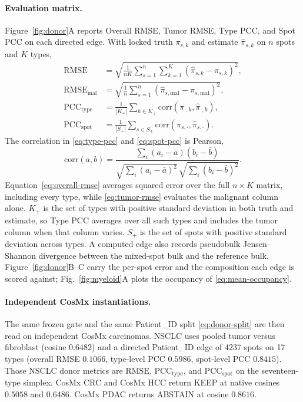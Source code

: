 \paragraph{Evaluation matrix.}
Figure~\ref{fig:donor}A reports Overall RMSE, Tumor RMSE, Type PCC, and Spot PCC on each directed edge. With locked truth \(\pi_{s,k}\) and estimate \(\hat\pi_{s,k}\) on \(n\) spots and \(K\) types,
\begin{align}
\mathrm{RMSE}
&= \sqrt{\frac{1}{nK}\sum_{s=1}^{n}\sum_{k=1}^{K}(\hat\pi_{s,k}-\pi_{s,k})^{2}},
\label{eq:overall-rmse}\\
\mathrm{RMSE}_{\mathrm{mal}}
&= \sqrt{\frac{1}{n}\sum_{s=1}^{n}(\hat\pi_{s,\mathrm{mal}}-\pi_{s,\mathrm{mal}})^{2}},
\label{eq:tumor-rmse}\\
\mathrm{PCC}_{\mathrm{type}}
&= \frac{1}{|K_+|}\sum_{k\in K_+}\mathrm{corr}(\pi_{\cdot,k},\hat\pi_{\cdot,k}),
\label{eq:type-pcc}\\
\mathrm{PCC}_{\mathrm{spot}}
&= \frac{1}{|S_+|}\sum_{s\in S_+}\mathrm{corr}(\pi_{s,\cdot},\hat\pi_{s,\cdot}).
\label{eq:spot-pcc}
\end{align}
The correlation in \eqref{eq:type-pcc} and \eqref{eq:spot-pcc} is Pearson,
\begin{equation}
\mathrm{corr}(a,b)=\frac{\sum_{i}(a_i-\bar a)(b_i-\bar b)}{\sqrt{\sum_{i}(a_i-\bar a)^{2}}\,\sqrt{\sum_{i}(b_i-\bar b)^{2}}}.
\label{eq:pearson}
\end{equation}
Equation~\eqref{eq:overall-rmse} averages squared error over the full \(n\times K\) matrix, including every type, while \eqref{eq:tumor-rmse} evaluates the malignant column alone. \(K_+\) is the set of types with positive standard deviation in both truth and estimate, so Type PCC averages over all such types and includes the tumor column when that column varies. \(S_+\) is the set of spots with positive standard deviation across types. A computed edge also records pseudobulk Jensen--Shannon divergence between the mixed-spot bulk and the reference bulk. Figure~\ref{fig:donor}B--C carry the per-spot error and the composition each edge is scored against; Fig.~\ref{fig:myeloid}A plots the occupancy of \eqref{eq:mean-occupancy}.

\paragraph{Independent CosMx instantiations.}
The same frozen gate and the same Patient\_ID split \eqref{eq:donor-split} are then read on independent CosMx carcinomas. NSCLC uses pooled tumor versus fibroblast (cosine \(0.6482\)) and a directed Patient\_ID edge of 4237 spots on 17 types (overall RMSE \(0.1066\), type-level PCC \(0.5986\), spot-level PCC \(0.8415\)). Those NSCLC donor metrics are \(\mathrm{RMSE}\), \(\mathrm{PCC}_{\mathrm{type}}\), and \(\mathrm{PCC}_{\mathrm{spot}}\) on the seventeen-type simplex. CosMx CRC and CosMx HCC return KEEP at native cosines \(0.5058\) and \(0.6486\). CosMx PDAC returns ABSTAIN at cosine \(0.8616\).

